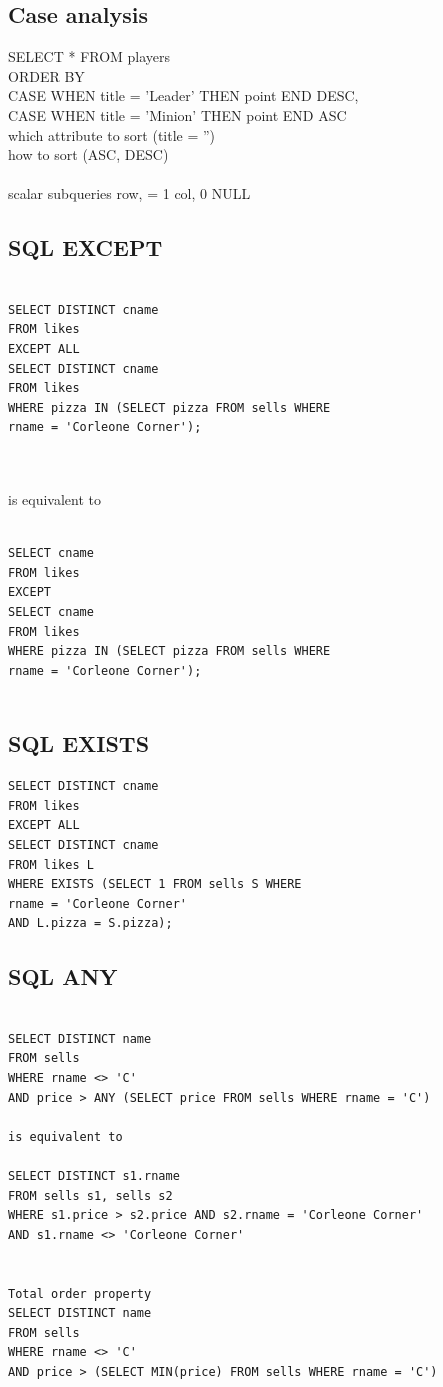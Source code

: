 \documentclass[11pt]{article}
\begin{document}
\subsection*{Case analysis}
SELECT * FROM players\\
ORDER BY\\
 CASE WHEN title = 'Leader' THEN point END DESC,\\
 CASE WHEN title = 'Minion' THEN point END ASC\\
 which attribute to sort  (title = '')\\
 how to sort (ASC, DESC)\\
 \\
 scalar subqueries  row, = 1 col, 0 \rightarrow NULL
 \\
  \subsection*{SQL EXCEPT}
  \begin{verbatim}

SELECT DISTINCT cname 
FROM likes
EXCEPT ALL
SELECT DISTINCT cname 
FROM likes
WHERE pizza IN (SELECT pizza FROM sells WHERE
rname = 'Corleone Corner');
  	
  \end{verbatim}
\\is equivalent to \\
   \begin{verbatim}

SELECT cname 
FROM likes
EXCEPT
SELECT cname 
FROM likes
WHERE pizza IN (SELECT pizza FROM sells WHERE
rname = 'Corleone Corner');
  	
  \end{verbatim}
  
  \subsection*{SQL EXISTS}
    \begin{verbatim}
SELECT DISTINCT cname 
FROM likes
EXCEPT ALL
SELECT DISTINCT cname 
FROM likes L
WHERE EXISTS (SELECT 1 FROM sells S WHERE
rname = 'Corleone Corner'
AND L.pizza = S.pizza);
    \end{verbatim}
  \subsection*{SQL ANY}
  \begin{verbatim}

SELECT DISTINCT name
FROM sells
WHERE rname <> 'C'
AND price > ANY (SELECT price FROM sells WHERE rname = 'C')

is equivalent to

SELECT DISTINCT s1.rname
FROM sells s1, sells s2
WHERE s1.price > s2.price AND s2.rname = 'Corleone Corner' 
AND s1.rname <> 'Corleone Corner'


Total order property
SELECT DISTINCT name
FROM sells
WHERE rname <> 'C'
AND price > (SELECT MIN(price) FROM sells WHERE rname = 'C')
    \end{verbatim}
    
\end{document}
